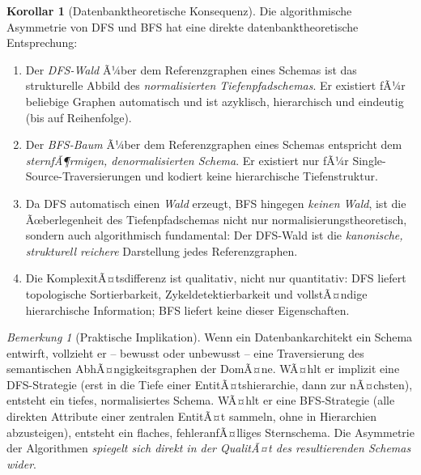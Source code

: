 ﻿\documentclass[a4paper,12pt]{report}
\theoremstyle{definition}
\newtheorem{corollary}[theorem]{Korollar}
\theoremstyle{remark}
\newtheorem{remark}{Bemerkung}[chapter]
\begin{document}
\begin{corollary}[Datenbanktheoretische Konsequenz]
\label{cor:konsequenz_asymmetrie}
Die algorithmische Asymmetrie von DFS und BFS hat eine direkte
datenbanktheoretische Entsprechung:

\begin{enumerate}[label=(\roman*)]
  \item Der \emph{DFS-Wald} Ã¼ber dem Referenzgraphen eines Schemas ist
        das strukturelle Abbild des \emph{normalisierten Tiefenpfadschemas}.
        Er existiert fÃ¼r beliebige Graphen automatisch und ist azyklisch,
        hierarchisch und eindeutig (bis auf Reihenfolge).
  \item Der \emph{BFS-Baum} Ã¼ber dem Referenzgraphen eines Schemas entspricht
        dem \emph{sternfÃ¶rmigen, denormalisierten Schema}. Er existiert nur
        fÃ¼r Single-Source-Traversierungen und kodiert keine hierarchische
        Tiefenstruktur.
  \item Da DFS automatisch einen \emph{Wald} erzeugt, BFS hingegen
        \emph{keinen Wald}, ist die Ãœberlegenheit des Tiefenpfadschemas
        nicht nur normalisierungstheoretisch, sondern auch algorithmisch
        fundamental: Der DFS-Wald ist die \emph{kanonische, strukturell
        reichere} Darstellung jedes Referenzgraphen.
  \item Die KomplexitÃ¤tsdifferenz ist qualitativ, nicht nur quantitativ:
        DFS liefert topologische Sortierbarkeit, Zykeldetektierbarkeit
        und vollstÃ¤ndige hierarchische Information; BFS liefert keine
        dieser Eigenschaften.
\end{enumerate}
\end{corollary}

\begin{remark}[Praktische Implikation]
Wenn ein Datenbankarchitekt ein Schema entwirft, vollzieht er -- bewusst
oder unbewusst -- eine Traversierung des semantischen AbhÃ¤ngigkeitsgraphen
der DomÃ¤ne. WÃ¤hlt er implizit eine DFS-Strategie (erst in die Tiefe einer
EntitÃ¤tshierarchie, dann zur nÃ¤chsten), entsteht ein tiefes, normalisiertes
Schema. WÃ¤hlt er eine BFS-Strategie (alle direkten Attribute einer zentralen
EntitÃ¤t sammeln, ohne in Hierarchien abzusteigen), entsteht ein flaches,
fehleranfÃ¤lliges Sternschema. Die Asymmetrie der Algorithmen \emph{spiegelt
sich direkt in der QualitÃ¤t des resultierenden Schemas wider}.
\end{remark}

\end{document}
